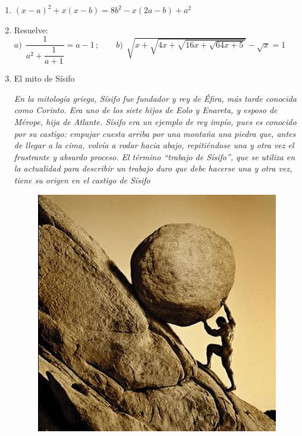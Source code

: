 \begin{enumerate}
\item	$(x-a)^2+x(x-b)=8b^2-x(2a-b)+a^2$

\vspace{-6mm}
\begin{flushright}
\begin{footnotesize} \textcolor{gris}{}	\end{footnotesize}
\end{flushright}


\item	Resuelve: $a)\ \ \dfrac{1}{a^2+\dfrac{1}{a+1}}=a-1\, ; \qquad b)\ \ \sqrt{x+\sqrt{4x+\sqrt{16x+\sqrt{64x+5}}}}-\sqrt{x}=1 $

\vspace{-4mm}
\begin{flushright}
\begin{footnotesize} \textcolor{gris}{}	\end{footnotesize}
\end{flushright}


\item	El mito de Sísifo

\begin{small} \emph{En la mitología griega, Sísifo fue fundador y rey de Éfira, más tarde conocida como Corinto. Era uno de los siete hijos de Eolo y Enareta, y esposo de Mérope, hija de Atlante. Sísifo era un ejemplo de rey impío, pues es conocido por su castigo: empujar cuesta arriba por una montaña una piedra que, antes de llegar a la cima, volvía a rodar hacia abajo, repitiéndose una y otra vez el frustrante y absurdo proceso. El término ``trabajo de Sísifo'', que se utiliza en la actualidad para describir un trabajo duro que debe hacerse una y otra vez, tiene su origen en el castigo de Sísifo} \end{small}

\begin{multicols}{2}
	\begin{figure}[H]
	\centering
	\includegraphics[width=.4\textwidth]{img-ecc/ecc16.jpeg}
\end{figure}


\end{multicols}
\end{enumerate}
